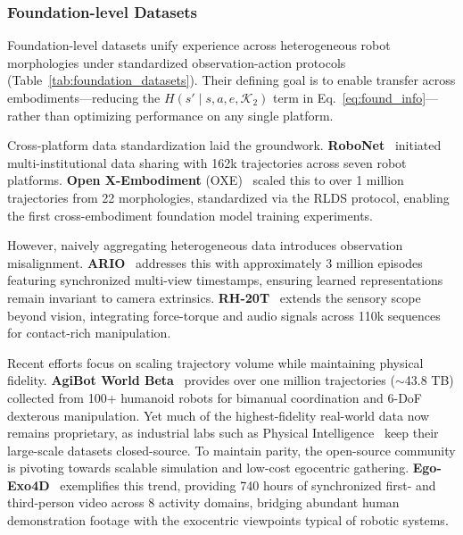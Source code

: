 \documentclass[acmsmall,screen,review,anonymous]{acmart}
\begin{document}
\subsubsection{Foundation-level Datasets}\label{sec:foundation_datasets}

Foundation-level datasets unify experience across heterogeneous robot morphologies under standardized observation-action protocols (Table~\ref{tab:foundation_datasets}). Their defining goal is to enable transfer across embodiments---reducing the $H(s' \mid s, a, e, \mathcal{K}_2)$ term in Eq.~\ref{eq:found_info}---rather than optimizing performance on any single platform.

Cross-platform data standardization laid the groundwork. \textbf{RoboNet}~\cite{dasari2020robonet} initiated multi-institutional data sharing with 162k trajectories across seven robot platforms. \textbf{Open X-Embodiment} (OXE)~\cite{padalkar2023open} scaled this to over 1 million trajectories from 22 morphologies, standardized via the RLDS protocol, enabling the first cross-embodiment foundation model training experiments.

However, naively aggregating heterogeneous data introduces observation misalignment. \textbf{ARIO}~\cite{wang2024ario} addresses this with approximately 3 million episodes featuring synchronized multi-view timestamps, ensuring learned representations remain invariant to camera extrinsics. \textbf{RH-20T}~\cite{fang2023rh} extends the sensory scope beyond vision, integrating force-torque and audio signals across 110k sequences for contact-rich manipulation.

Recent efforts focus on scaling trajectory volume while maintaining physical fidelity. \textbf{AgiBot World Beta}~\cite{agibot2025} provides over one million trajectories ($\sim$43.8 TB) collected from 100+ humanoid robots for bimanual coordination and 6-DoF dexterous manipulation. Yet much of the highest-fidelity real-world data now remains proprietary, as industrial labs such as Physical Intelligence~\cite{black2024pi0} keep their large-scale datasets closed-source. To maintain parity, the open-source community is pivoting towards scalable simulation and low-cost egocentric gathering. \textbf{Ego-Exo4D}~\cite{grauman2024egoexo4d} exemplifies this trend, providing 740 hours of synchronized first- and third-person video across 8 activity domains, bridging abundant human demonstration footage with the exocentric viewpoints typical of robotic systems.
\end{document}
